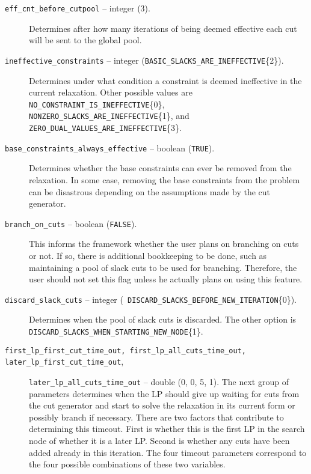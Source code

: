 \begin{description}
\item[{\tt eff\_cnt\_before\_cutpool} -- integer (3).]
Determines after how many iterations of being deemed effective each
cut will be sent to the global pool.

\item[{\tt ineffective\_constraints} -- integer
({\tt BASIC\_SLACKS\_ARE\_INEFFECTIVE}\{2\}).]
Determines under what condition a constraint is deemed ineffective in
the current relaxation. Other possible values are {\tt
NO\_CONSTRAINT\_IS\_INEFFECTIVE}\{0\},  {\tt
NONZERO\_SLACKS\_ARE\_INEFFECTIVE}\{1\}, and \\
{\tt ZERO\_DUAL\_VALUES\_ARE\_INEFFECTIVE}\{3\}.

\item[{\tt base\_constraints\_always\_effective} -- boolean ({\tt TRUE}).]
Determines whether the base constraints can ever be removed from the
relaxation. In some case, removing the base constraints from the
problem can be disastrous depending on the assumptions made by the cut
generator.

\item[{\tt branch\_on\_cuts} -- boolean ({\tt FALSE}).]
This informs the framework whether the user plans on branching on cuts
or not. If so, there is additional bookkeeping to be done, such as
maintaining a pool of slack cuts to be used for branching. Therefore,
the user should not set this flag unless he actually plans on using
this feature.

\item[{\tt discard\_slack\_cuts} -- integer ({\tt
DISCARD\_SLACKS\_BEFORE\_NEW\_ITERATION}\{0\}).]
Determines when the pool of slack cuts is discarded. The other option
is {\tt DISCARD\_SLACKS\_WHEN\_STARTING\_NEW\_NODE}\{1\}.


\item[{\tt first\_lp\_first\_cut\_time\_out,
first\_lp\_all\_cuts\_time\_out,
later\_lp\_first\_cut\_time\_out},] {\tt later\_lp\_all\_cuts\_time\_out} --
double (0, 0, 5, 1).
The next group of parameters determines when the LP should give up
waiting for cuts from the cut generator and start to solve the
relaxation in its current form or possibly branch if necessary. There
are two factors that contribute to determining this timeout. First
is whether this is the first LP in the search node of whether it is a
later LP. Second is whether any cuts have been added already in this
iteration. The four timeout parameters correspond to the four possible
combinations of these two variables.


\end{description}

